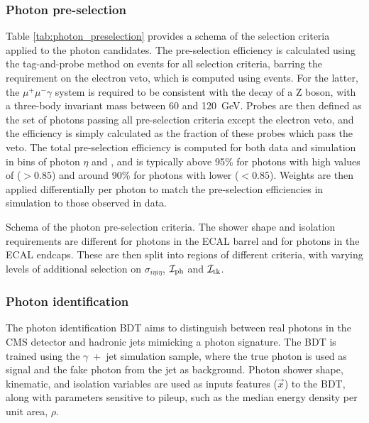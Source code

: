 \subsubsection{Photon pre-selection}\label{sec:photon_preselection}
Table \ref{tab:photon_preselection} provides a schema of the selection criteria applied to the photon candidates. The pre-selection efficiency is calculated using the tag-and-probe method on \Zee events for all selection criteria, barring the requirement on the electron veto, which is computed using \Zmumug events. For the latter, the $\mu^{+}\mu^{-}\gamma$ system is required to be consistent with the decay of a Z boson, with a three-body invariant mass between 60 and 120~GeV. Probes are then defined as the set of photons passing all pre-selection criteria except the electron veto, and the efficiency is simply calculated as the fraction of these probes which pass the veto. The total pre-selection efficiency is computed for both data and simulation in bins of photon $\eta$ and \RNINE, and is typically above 95\% for photons with high values of \RNINE ($>0.85$) and around 90\% for photons with lower \RNINE ($<0.85$). Weights are then applied differentially per photon to match the pre-selection efficiencies in simulation to those observed in data.

\begin{table}[htb!]
    \caption[Schema of the photon pre-selection criteria]{Schema of the photon pre-selection criteria. The shower shape and isolation requirements are different for photons in the ECAL barrel and for photons in the ECAL endcaps. These are then split into regions of different \RNINE criteria, with varying levels of additional selection on $\sigma_{i\eta i\eta}$, $\mathcal{I}_{\rm{ph}}$ and $\mathcal{I}_{\rm{tk}}$.}
    \label{tab:photon_preselection}
    \vspace{.5cm}
    \centering
    \scriptsize
    \renewcommand{\arraystretch}{1.5}
    
\end{table}


\subsubsection{Photon identification}
The photon identification BDT aims to distinguish between real photons in the CMS detector and hadronic jets mimicking a photon signature. The BDT is trained using the $\gamma$~+~jet simulation sample, where the true photon is used as signal and the fake photon from the jet as background. Photon shower shape, kinematic, and isolation variables are used as inputs features ($\vec{x}$) to the BDT, along with parameters sensitive to pileup, such as the median energy density per unit area, $\rho$. 

